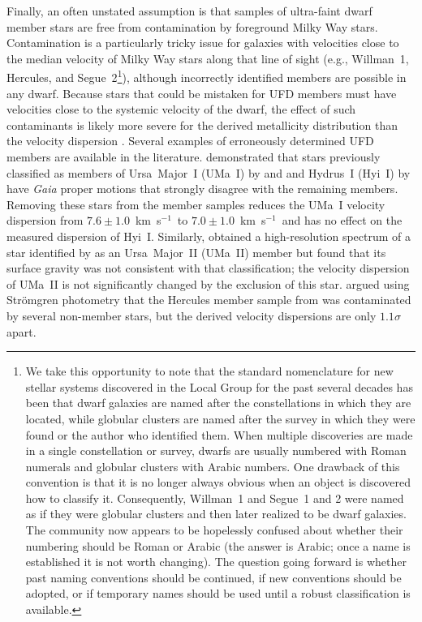 \documentclass[a4paper]{ar-1col}
\newcommand{\kms}         {km~s$^{-1}$}
\begin{document}
Finally, an often unstated assumption is that samples of ultra-faint
dwarf member stars are free from contamination by foreground Milky Way
stars.  Contamination is a particularly tricky issue for galaxies with
velocities close to the median velocity of Milky Way stars along that
line of sight (e.g., Willman~1, Hercules, and Segue~2\footnote{We take
  this opportunity to note that the standard nomenclature for new
  stellar systems discovered in the Local Group for the past several
  decades has been that dwarf galaxies are named after the
  constellations in which they are located, while globular clusters
  are named after the survey in which they were found or the author
  who identified them.  When multiple discoveries are made in a single
  constellation or survey, dwarfs are usually numbered with Roman
  numerals and globular clusters with Arabic numbers.  One drawback of
  this convention is that it is no longer always obvious when an
  object is discovered how to classify it.  Consequently, Willman~1
  and Segue~1 and 2 were named as if they were globular clusters and
  then later realized to be dwarf galaxies.  The community now appears
  to be hopelessly confused about whether their numbering should be
  Roman or Arabic (the answer is Arabic; once a name is established it
  is not worth changing).  The question going forward is whether past
  naming conventions should be continued, if new conventions should be
  adopted, or if temporary names should be used until a robust
  classification is available.}), although incorrectly identified
members are possible in any dwarf.  Because stars that could be
mistaken for UFD members must have velocities close to the systemic
velocity of the dwarf, the effect of such contaminants is likely more
severe for the derived metallicity distribution than the velocity
dispersion \citep[e.g.,][]{siegel08,kirby17}.  Several examples of
erroneously determined UFD members are available in the literature.
\citet{simon18} demonstrated that stars previously classified as
members of Ursa~Major~I (UMa~I) by \citet{kleyna05} and \citet{sg07}
and Hydrus~I (Hyi~I) by \citet{koposov18} have \emph{Gaia} proper
motions that strongly disagree with the remaining members.  Removing
these stars from the member samples reduces the UMa~I velocity
dispersion from $7.6 \pm 1.0$~\kms\ to $7.0 \pm 1.0$~\kms\ and has no
effect on the measured dispersion of Hyi~I.  Similarly,
\citet{frebel10} obtained a high-resolution spectrum of a star
identified by \citet{sg07} as an Ursa~Major~II (UMa~II) member but
found that its surface gravity was not consistent with that
classification; the velocity dispersion of UMa~II is not significantly
changed by the exclusion of this star.  \citet{aden09} argued using
Str{\"o}mgren photometry that the Hercules member sample from
\citet{sg07} was contaminated by several non-member stars, but the
derived velocity dispersions are only $1.1\sigma$ apart.
\end{document}
